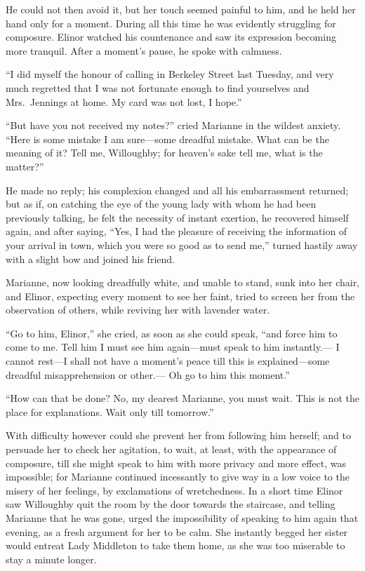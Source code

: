 He could not then avoid it, but her touch seemed
painful to him, and he held her hand only for a moment.
During all this time he was evidently struggling for composure.
Elinor watched his countenance and saw its expression
becoming more tranquil.  After a moment's pause, he spoke
with calmness.

``I did myself the honour of calling in Berkeley
Street last Tuesday, and very much regretted that I was
not fortunate enough to find yourselves and Mrs.\ Jennings
at home.  My card was not lost, I hope.''

``But have you not received my notes?'' cried Marianne
in the wildest anxiety.  ``Here is some mistake I am
sure---some dreadful mistake.  What can be the meaning
of it?  Tell me, Willoughby; for heaven's sake tell me,
what is the matter?''

He made no reply; his complexion changed and all his
embarrassment returned; but as if, on catching the eye
of the young lady with whom he had been previously talking,
he felt the necessity of instant exertion, he recovered
himself again, and after saying, ``Yes, I had the pleasure
of receiving the information of your arrival in town,
which you were so good as to send me,'' turned hastily away
with a slight bow and joined his friend.

Marianne, now looking dreadfully white, and unable
to stand, sunk into her chair, and Elinor, expecting every
moment to see her faint, tried to screen her from the
observation of others, while reviving her with lavender water.

``Go to him, Elinor,'' she cried, as soon as she
could speak, ``and force him to come to me.  Tell him
I must see him again---must speak to him instantly.---%
I cannot rest---I shall not have a moment's peace till this
is explained---some dreadful misapprehension or other.---%
Oh go to him this moment.''

``How can that be done? No, my dearest Marianne,
you must wait.  This is not the place for explanations.
Wait only till tomorrow.''

With difficulty however could she prevent her
from following him herself; and to persuade her to check
her agitation, to wait, at least, with the appearance
of composure, till she might speak to him with more privacy
and more effect, was impossible; for Marianne continued
incessantly to give way in a low voice to the misery
of her feelings, by exclamations of wretchedness.
In a short time Elinor saw Willoughby quit the room by the
door towards the staircase, and telling Marianne that he
was gone, urged the impossibility of speaking to him again
that evening, as a fresh argument for her to be calm.
She instantly begged her sister would entreat Lady
Middleton to take them home, as she was too miserable
to stay a minute longer.

